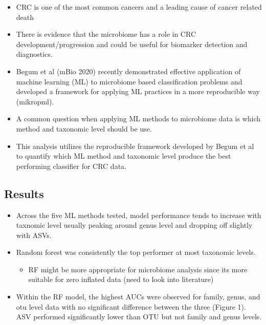 \documentclass[
]{article}
\providecommand{\tightlist}{%
  \setlength{\itemsep}{0pt}\setlength{\parskip}{0pt}}
\begin{document}
\begin{itemize}
\tightlist
\item
  CRC is one of the most common cancers and a leading cause of cancer
  related death
\item
  There is evidence that the microbiome has a role in CRC
  development/progression and could be useful for biomarker detection
  and diagnostics.
\item
  Begum et al (mBio 2020) recently demonstrated effective application of
  machine learning (ML) to microbiome based classification problems and
  developed a framework for applying ML practices in a more reproducible
  way (mikropml).
\item
  A common question when applying ML methods to microbiome data is which
  method and taxonomic level should be use.
\item
  This analysis utilizes the reproducible framework developed by Begum
  et al to quantify which ML method and taxonomic level produce the best
  performing classifier for CRC data.
\end{itemize}

\newpage

\hypertarget{results}{%
\subsection{Results}\label{results}}

\begin{itemize}
\tightlist
\item
  Across the five ML methods tested, model performance tends to increase
  with taxnomic level usually peaking around genus level and dropping
  off slightly with ASVs.
\item
  Random forest was consistently the top performer at most taxonomic
  levels.

  \begin{itemize}
  \tightlist
  \item
    RF might be more appropriate for microbiome analysis since its more
    suitable for zero inflated data (need to look into literature)
  \end{itemize}
\item
  Within the RF model, the highest AUCs were observed for family, genus,
  and otu level data with no significant difference between the three
  (Figure 1). ASV performed significantly lower than OTU but not family
  and genus levels.
\end{itemize}
\end{document}
